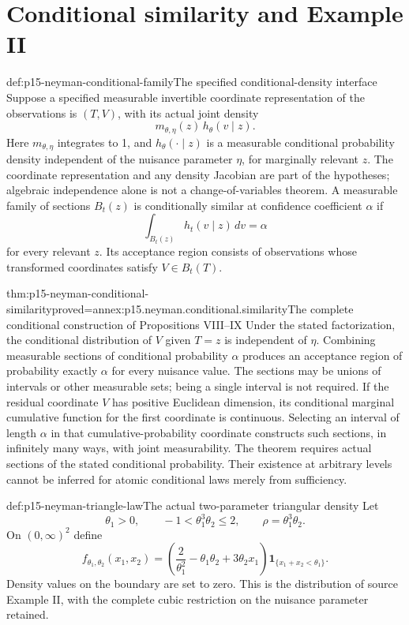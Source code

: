 \section{Conditional similarity and Example II}

\begin{hbdefinition}{def:p15-neyman-conditional-family}{The specified conditional-density interface}
Suppose a specified measurable invertible coordinate representation
of the observations is \((T,V)\), with its actual joint density
\[
                    m_{\theta,\eta}(z)\,h_\theta(v\mid z).
\]
Here \(m_{\theta,\eta}\) integrates to 1, and \(h_\theta(\cdot\mid z)\)
is a measurable conditional probability density independent of
the nuisance parameter \(\eta\), for marginally relevant \(z\).
The coordinate representation and any density Jacobian are part of
the hypotheses; algebraic independence alone is not a change-of-variables
theorem.
A measurable family of sections \(B_t(z)\) is conditionally similar
at confidence coefficient \(\alpha\) if
\[
                       \int_{B_t(z)}h_t(v\mid z)\,dv=\alpha
\]
for every relevant \(z\). Its acceptance region consists of observations
whose transformed coordinates satisfy \(V\in B_t(T)\).
\end{hbdefinition}

\begin{hbtheorem}{thm:p15-neyman-conditional-similarity}{proved=annex:p15.neyman.conditional.similarity}{The complete conditional construction of Propositions VIII--IX}
Under the stated factorization, the conditional distribution of \(V\)
given \(T=z\) is independent of \(\eta\). Combining measurable
sections of conditional probability \(\alpha\) produces an acceptance
region of probability exactly \(\alpha\) for every nuisance value.
The sections may be unions of intervals or other measurable sets;
being a single interval is not required.
If the residual coordinate \(V\) has positive Euclidean dimension,
its conditional marginal cumulative function for the first coordinate
is continuous. Selecting an interval of length \(\alpha\) in that
cumulative-probability coordinate constructs such sections, in
infinitely many ways, with joint measurability.
The theorem requires actual sections of the stated conditional
probability. Their existence at arbitrary levels cannot be inferred
for atomic conditional laws merely from sufficiency.
\end{hbtheorem}

\begin{hbdefinition}{def:p15-neyman-triangle-law}{The actual two-parameter triangular density}
Let
\[
 \theta_1>0,\qquad -1<\theta_1^3\theta_2\leq2,\qquad
 \rho=\theta_1^3\theta_2.
\]
On \((0,\infty)^2\) define
\[
 f_{\theta_1,\theta_2}(x_1,x_2)=
 \left(\frac2{\theta_1^2}-\theta_1\theta_2+3\theta_2x_1\right)
                           \mathbf1_{\{x_1+x_2<\theta_1\}}.
\]
Density values on the boundary are set to zero.
This is the distribution of source Example II, with the complete
cubic restriction on the nuisance parameter retained.
\end{hbdefinition}

